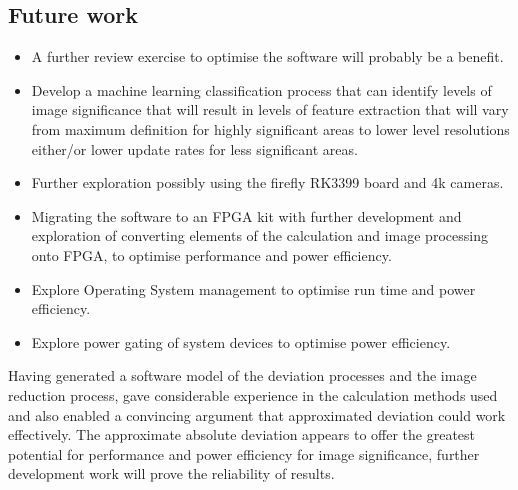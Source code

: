 \documentclass[journal]{IEEEtran}
\begin{document}

\subsection{Future work} 
\begin{itemize}
\item A further review exercise to optimise the software will probably be a benefit. 
\item Develop a machine learning classification process that can identify levels of image significance that will result in levels of feature extraction that will vary from maximum definition for highly significant areas to lower level resolutions either\slash or lower update rates for less significant areas.
\item Further exploration possibly using the firefly RK3399 board and 4k cameras.
\item Migrating the software to an FPGA kit with further development and exploration of converting elements of the calculation and image processing onto FPGA, to optimise performance and power efficiency.
\item Explore Operating System management to optimise run time and power efficiency.
\item Explore power gating of system devices to optimise power efficiency.
\end{itemize}
Having generated a software model of the deviation processes and the image reduction process, gave considerable experience in the calculation methods used and also enabled a convincing argument that approximated deviation could work effectively.
The approximate absolute deviation appears to offer the greatest potential for performance and power efficiency for image significance, further development work will prove the reliability of results. \\
\end{document}
